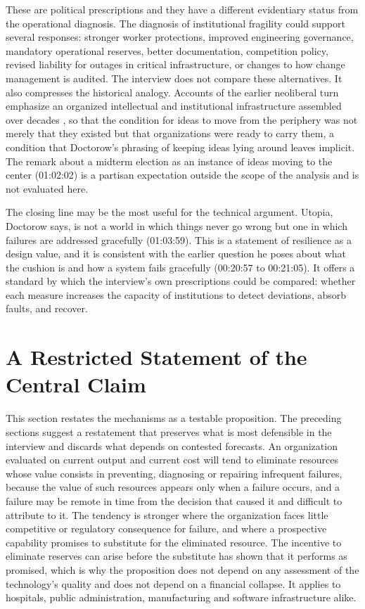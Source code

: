 \documentclass[12pt]{article}
\newcommand{\ts}[1]{(#1)}
\begin{document}
These are political prescriptions and they have a different evidentiary status from the operational diagnosis. The diagnosis of institutional fragility could support several responses: stronger worker protections, improved engineering governance, mandatory operational reserves, better documentation, competition policy, revised liability for outages in critical infrastructure, or changes to how change management is audited. The interview does not compare these alternatives. It also compresses the historical analogy. Accounts of the earlier neoliberal turn emphasize an organized intellectual and institutional infrastructure assembled over decades \cite{mirowski}, so that the condition for ideas to move from the periphery was not merely that they existed but that organizations were ready to carry them, a condition that Doctorow's phrasing of keeping ideas lying around leaves implicit. The remark about a midterm election as an instance of ideas moving to the center \ts{01:02:02} is a partisan expectation outside the scope of the analysis and is not evaluated here.

The closing line may be the most useful for the technical argument. Utopia, Doctorow says, is not a world in which things never go wrong but one in which failures are addressed gracefully \ts{01:03:59}. This is a statement of resilience as a design value, and it is consistent with the earlier question he poses about what the cushion is and how a system fails gracefully \ts{00:20:57 to 00:21:05}. It offers a standard by which the interview's own prescriptions could be compared: whether each measure increases the capacity of institutions to detect deviations, absorb faults, and recover.

\section{A Restricted Statement of the Central Claim}

This section restates the mechanisms as a testable proposition. The preceding sections suggest a restatement that preserves what is most defensible in the interview and discards what depends on contested forecasts. An organization evaluated on current output and current cost will tend to eliminate resources whose value consists in preventing, diagnosing or repairing infrequent failures, because the value of such resources appears only when a failure occurs, and a failure may be remote in time from the decision that caused it and difficult to attribute to it. The tendency is stronger where the organization faces little competitive or regulatory consequence for failure, and where a prospective capability promises to substitute for the eliminated resource. The incentive to eliminate reserves can arise before the substitute has shown that it performs as promised, which is why the proposition does not depend on any assessment of the technology's quality and does not depend on a financial collapse. It applies to hospitals, public administration, manufacturing and software infrastructure alike.
\end{document}
